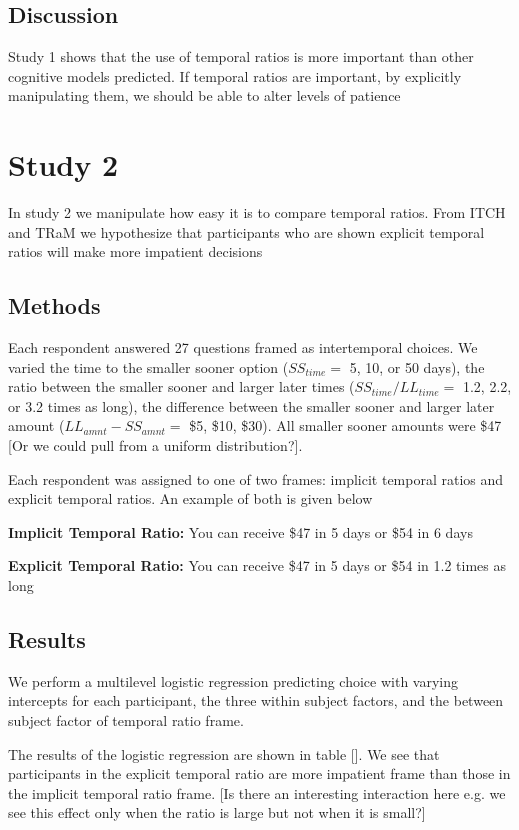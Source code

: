 \documentclass[]{article}
\begin{document}
\subsection{Discussion}

Study 1 shows that the use of temporal ratios is more important than other cognitive models predicted. 
If temporal ratios are important, by explicitly manipulating them, we should be able to alter levels of patience

\section{Study 2}

In study 2 we manipulate how easy it is to compare temporal ratios. 
From ITCH and TRaM we hypothesize that participants who are shown explicit temporal ratios will make more impatient decisions 

\subsection{Methods}

Each respondent answered 27 questions framed as intertemporal choices.
We varied the time to the smaller sooner option ($SS_{time} =$ 5, 10, or 50 days), 
the ratio between the smaller sooner and larger later times ($SS_{time} / LL_{time}  = $ 1.2, 2.2, or 3.2 times as long), 
 the difference between the smaller sooner and larger later amount ($LL_{amnt} - SS_{amnt} =$ \$5, \$10, \$30). All smaller sooner amounts were \$47 [Or we could pull from a uniform distribution?].

Each respondent was assigned to one of two frames: implicit temporal ratios and explicit temporal ratios. An example of both is given below

\textbf{Implicit Temporal Ratio: } You can receive \$47 in 5 days or \$54 in 6 days

\textbf{Explicit Temporal Ratio: } You can receive \$47 in 5 days or \$54 in 1.2 times as long

\subsection{Results}

We perform a multilevel logistic regression predicting choice with varying intercepts for each participant, the three within subject factors, and the between subject factor of temporal ratio frame. 

The results of the logistic regression are shown in table []. We see that participants in the explicit temporal ratio are more impatient frame than those in the implicit temporal ratio frame. [Is there an interesting interaction here e.g. we see this effect only when the ratio is large but not when it is small?]
\end{document}
